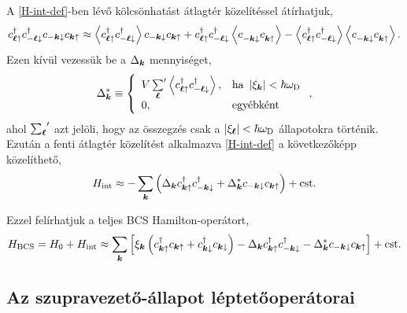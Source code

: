 \documentclass[a4paper,12pt,titlepage]{article}
\newcommand{\KK}{{\vb*{k}}}
\newcommand{\LL}{{\vb*{\ell}}}
\newcommand{\phantomdagger}{{\phantom{\dagger}}}
\begin{document}
A \eqref{H-int-def}-ben lévő kölcsönhatást átlagtér közelítéssel átírhatjuk,
\begin{equation}
	c_{\LL \uparrow}^\dagger c_{-\LL \downarrow}^\dagger c_{-\KK \downarrow} c_{\KK \uparrow} \approx \expval{c_{\LL \uparrow}^\dagger c_{-\LL \downarrow}^\dagger} c_{-\KK \downarrow} c_{\KK \uparrow} + c_{\LL \uparrow}^\dagger c_{-\LL \downarrow}^\dagger \expval{c_{-\KK \downarrow}^\phantomdagger c_{\KK \uparrow}^\phantomdagger} - \expval{c_{\LL \uparrow}^\dagger c_{-\LL \downarrow}^\dagger} \expval{c_{-\KK \downarrow}^\phantomdagger c_{\KK \uparrow}^\phantomdagger}.
\end{equation}
Ezen kívül vezessük be a $\Delta_\KK$ mennyiséget,
\begin{equation}
	\Delta_\KK^* \equiv \left\{ \begin{array}{ll}
	V \, {\sum\limits_\LL}^\prime \expval{c_{\LL \uparrow}^\dagger c_{-\LL \downarrow}^\dagger}, & \text{ha } \left| \xi_\KK \right| < \hbar \omega_\text{D} \\
	0, & \text{egyébként}
	\end{array} \right. ,
\end{equation}
ahol ${\sum_\LL}^\prime$ azt jelöli, hogy az összegzés csak a $\left| \xi_\LL \right| < \hbar \omega_\text{D}$ állapotokra történik.  Ezután a fenti átlagtér közelítést alkalmazva \eqref{H-int-def} a következőképp közelíthető,
\begin{equation}
	H_\text{int} \approx - \sum\limits_\KK \left( \Delta_\KK c_{\KK \uparrow}^\dagger c_{-\KK \downarrow}^\dagger + \Delta_\KK^* c_{-\KK \downarrow} c_{\KK \uparrow} \right) + \text{cst}.
\end{equation}

Ezzel felírhatjuk a teljes BCS Hamilton-operátort,
\begin{equation}
	H_\text{BCS} = H_0 + H_\text{int} \approx \sum\limits_\KK \left[ \xi_\KK \left( c_{\KK \uparrow}^\dagger c_{\KK \uparrow} + c_{\KK \downarrow}^\dagger c_{\KK \downarrow} \right) - \Delta_\KK c_{\KK \uparrow}^\dagger c_{-\KK \downarrow}^\dagger - \Delta_\KK^* c_{-\KK \downarrow} c_{\KK \uparrow} \right] + \text{cst}.
\end{equation}


\subsection{Az szupravezető-állapot léptetőoperátorai}
\end{document}

